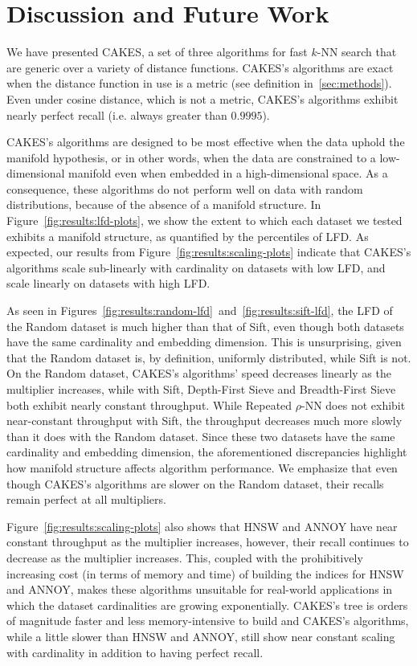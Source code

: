 \section{Discussion and Future Work}
\label{sec:discussion-and-future-work}

We have presented CAKES, a set of three algorithms for fast $k$-NN search that are generic over a variety of distance functions.
CAKES's algorithms are exact when the distance function in use is a metric (see definition in~\ref{sec:methods}).
Even under cosine distance, which is not a metric, CAKES's algorithms exhibit nearly perfect recall (i.e. always greater than $0.9995$).

CAKES's algorithms are designed to be most effective when the data uphold the manifold hypothesis, or in other words, when the data are constrained to a low-dimensional manifold even when embedded in a high-dimensional space.
As a consequence, these algorithms do not perform well on data with random distributions, because of the absence of a manifold structure.
In Figure~\ref{fig:results:lfd-plots}, we show the extent to which each dataset we tested exhibits a manifold structure, as quantified by the percentiles of LFD.
As expected, our results from Figure~\ref{fig:results:scaling-plots} indicate that CAKES's algorithms scale sub-linearly with cardinality on datasets with low LFD, and scale linearly on datasets with high LFD.

As seen in Figures~\ref{fig:results:random-lfd}~and~\ref{fig:results:sift-lfd}, the LFD of the Random dataset is much higher than that of Sift, even though both datasets have the same cardinality and embedding dimension. 
This is unsurprising, given that the Random dataset is, by definition, uniformly distributed, while Sift is not.
On the Random dataset, CAKES's algorithms' speed decreases linearly as the multiplier increases, while with Sift, Depth-First Sieve and Breadth-First Sieve both exhibit nearly constant throughput.
While Repeated $\rho$-NN does not exhibit near-constant throughput with Sift, the throughput decreases much more slowly than it does with the Random dataset.
Since these two datasets have the same cardinality and embedding dimension, the aforementioned discrepancies highlight how manifold structure affects algorithm performance.
We emphasize that even though CAKES's algorithms are slower on the Random dataset, their recalls remain perfect at all multipliers.

Figure~\ref{fig:results:scaling-plots} also shows that HNSW and ANNOY have near constant throughput as the multiplier increases, however, their recall continues to decrease as the multiplier increases.
This, coupled with the prohibitively increasing cost (in terms of memory and time) of building the indices for HNSW and ANNOY, makes these algorithms unsuitable for real-world applications in which the dataset cardinalities are growing exponentially.
CAKES's tree is orders of magnitude faster and less memory-intensive to build and CAKES's algorithms, while a little slower than HNSW and ANNOY, still show near constant scaling with cardinality in addition to having perfect recall.

